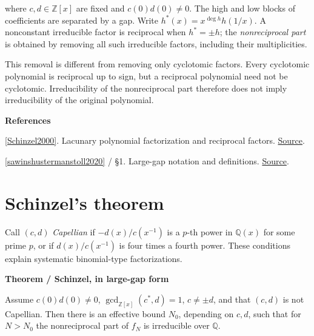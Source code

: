 \documentclass[11pt,a4paper,oneside,openany]{book}
\newcommand{\atlasdisplay}[1]{\par\begingroup\centering\vspace{3pt}\noindent\adjustbox{max width=\linewidth}{\(\displaystyle #1\)}\par\vspace{5pt}\endgroup}
\newenvironment{sources}{\par\smallskip\begingroup\footnotesize\color{atlasgray}\leftskip=10pt\setlength{\parskip}{2pt}}{\par\endgroup\smallskip}
\begin{document}
\atlasdisplay{f_N(x)=x^N c(x^{-1})+d(x),\qquad N>\deg c+\deg d,}

\color{black} where \(c,d\in\mathbb Z[x]\) are fixed and \(c(0)d(0)\ne0\). The high and low blocks of coefficients are separated by a gap. Write \(h^*(x)=x^{\deg h}h(1/x)\). A nonconstant irreducible factor is reciprocal when \(h^*=\pm h\); the \emph{nonreciprocal part} is obtained by removing all such irreducible factors, including their multiplicities.\par

\color{black} This removal is different from removing only cyclotomic factors. Every cyclotomic polynomial is reciprocal up to sign, but a reciprocal polynomial need not be cyclotomic. Irreducibility of the nonreciprocal part therefore does not imply irreducibility of the original polynomial.\par
\begin{sources}
\textbf{References}\par\smallskip
\noindent\hyperlink{ref:Schinzel2000}{[Schinzel2000]}. Lacunary polynomial factorization and reciprocal factors. \href{https://doi.org/10.1017/CBO9780511542916}{Source}.\par
\noindent\hyperlink{ref:sawinshustermanstoll2020}{[sawinshustermanstoll2020]} / §1. Large-gap notation and definitions. \href{https://arxiv.org/abs/1803.10811}{Source}.\par
\end{sources}\color{black}
\section{Schinzel's theorem}
\color{black} Call \((c,d)\) \emph{Capellian} if \(-d(x)/c(x^{-1})\) is a \(p\)-th power in \(\mathbb Q(x)\) for some prime \(p\), or if \(d(x)/c(x^{-1})\) is four times a fourth power. These conditions explain systematic binomial-type factorizations.\par


\begin{atlasblock}[standard]
\textbf{\sffamily Theorem  /  Schinzel, in large-gap form}\par\smallskip
\color{black} Assume \(c(0)d(0)\ne0\), \(\gcd_{\mathbb Z[x]}(c^*,d)=1\), \(c\ne\pm d\), and that \((c,d)\) is not Capellian. Then there is an effective bound \(N_0\), depending on \(c,d\), such that for \(N>N_0\) the nonreciprocal part of \(f_N\) is irreducible over \(\mathbb Q\).\par
\end{atlasblock}\color{black}
\end{document}
